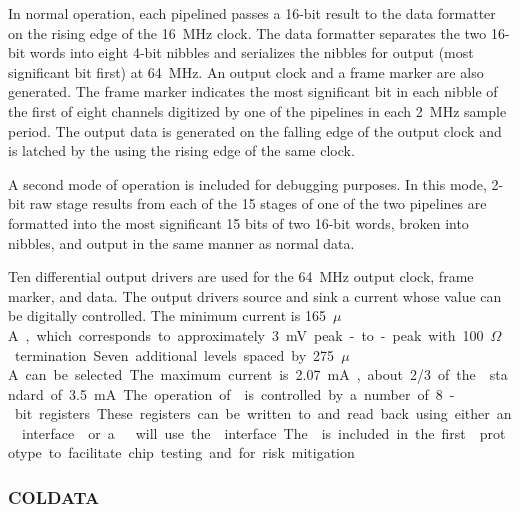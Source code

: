 In normal operation, each pipelined  passes a \num{16}-bit result to the
data formatter on the rising edge of the \SI{16}{MHz} clock.  The data formatter
separates the two \num{16}-bit words into eight \num{4}-bit nibbles and serializes the
nibbles for output (most significant bit first) at \SI{64}{MHz}.   An output
clock and a frame marker are also generated.  The frame marker indicates the most
significant bit in each nibble of the first of eight channels digitized by one
of the  pipelines in each \SI{2}{MHz} sample period.  The output data
is generated on the falling edge of the output clock and is latched by the
  using the rising edge of the same clock.  

A second
mode of operation is included for debugging purposes.  In this mode, \num{2}-bit raw
stage results from each of the \num{15} stages of one of the two pipelines are formatted
into the most significant \num{15} bits of two \num{16}-bit words, broken into nibbles, and
output in the same manner as normal data.

Ten differential output drivers are used for the \SI{64}{MHz} output clock, frame
marker, and  data.  The output drivers source and sink a current whose
value can be digitally controlled.  The minimum current is \SI{165}{$\mu$A},
which corresponds to approximately \SI{3}{mV} peak-to-peak with \SI{100}{$\Omega$}
termination.  Seven additional levels spaced by \SI{275}{$\mu$A} can be selected.
The maximum current is \SI{2.07}{mA}, about \num{2/3} of the  standard of
\SI{3.5}{mA}.

The operation of  is controlled by a number of \num{8}-bit registers.
These registers can be written to and read back using either an 
interface~\cite{bib:I2C} or a .  will use the  interface.  The
 is included in the first  prototype to facilitate chip testing
and for risk mitigation.


\subsubsection{COLDATA }
\label{sec:fdsp-tpcelec-design-femb-coldata}

